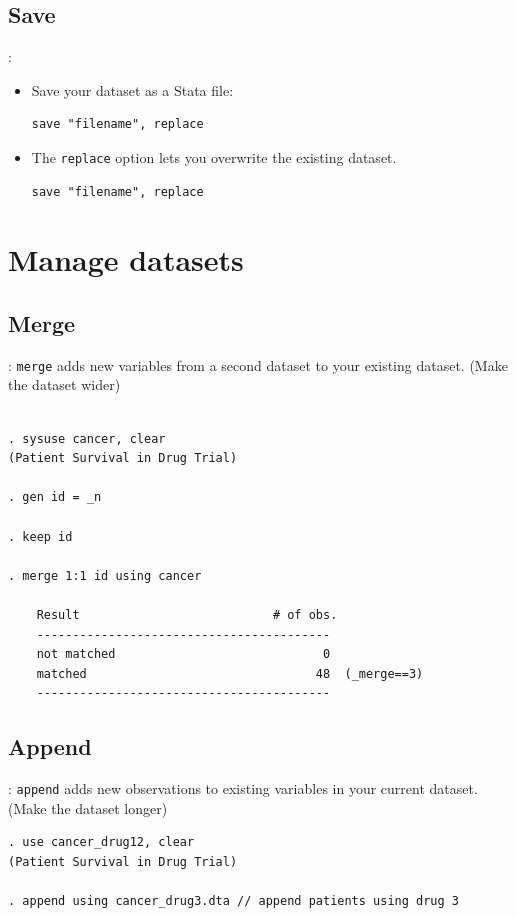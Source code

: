 \subsection{Save}
\begin{frame}[fragile]{\secname: \subsecname}
\begin{itemize}
\item Save your dataset as a Stata file: 
\begin{verbatim}
save "filename", replace
\end{verbatim} 

\item The \verb|replace| option lets you overwrite the existing dataset.
\begin{verbatim}
save "filename", replace
\end{verbatim} 
\end{itemize}
\end{frame}


\section{Manage datasets}
\subsection{Merge}
\begin{frame}[fragile]{\secname : \subsecname}
\verb|merge| adds new variables from a second dataset to your existing dataset.
(Make the dataset wider)\\[4mm]
\small
\begin{verbatim}

. sysuse cancer, clear
(Patient Survival in Drug Trial)

. gen id = _n 

. keep id

. merge 1:1 id using cancer 

    Result                           # of obs.
    -----------------------------------------
    not matched                             0
    matched                                48  (_merge==3)
    -----------------------------------------

\end{verbatim}
\end{frame}

\subsection{Append}
\begin{frame}[fragile]{\secname : \subsecname}
\verb|append| adds new observations to existing variables in your current dataset. \\ (Make the dataset longer) \\[4mm]
\small
\begin{verbatim}
. use cancer_drug12, clear 
(Patient Survival in Drug Trial)

. append using cancer_drug3.dta // append patients using drug 3
\end{verbatim}
\end{frame}

